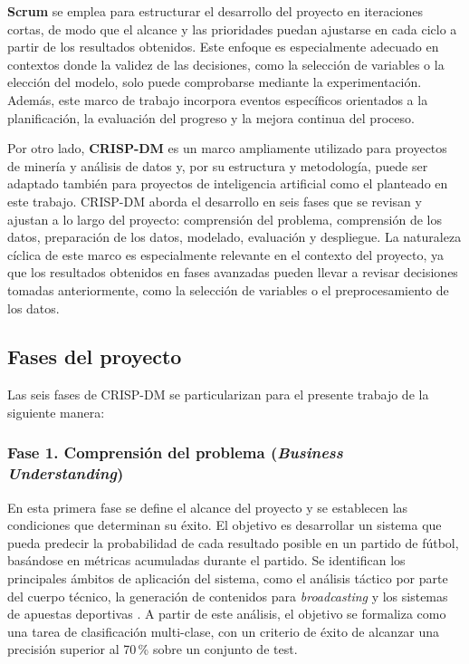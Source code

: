 \textbf{Scrum} se emplea para estructurar el desarrollo del proyecto en iteraciones cortas, de modo que el alcance y las prioridades puedan ajustarse en cada ciclo a partir de los resultados obtenidos. Este enfoque es especialmente adecuado en contextos donde la validez de las decisiones, como la selección de variables o la elección del modelo, solo puede comprobarse mediante la experimentación. Además, este marco de trabajo incorpora eventos específicos orientados a la planificación, la evaluación del progreso y la mejora continua del proceso.

Por otro lado, \textbf{CRISP-DM} es un marco ampliamente utilizado para proyectos de minería y análisis de datos y, por su estructura y metodología, puede ser adaptado también para proyectos de inteligencia artificial como el planteado en este trabajo. CRISP-DM aborda el desarrollo en seis fases que se revisan y ajustan a lo largo del proyecto: comprensión del problema, comprensión de los datos, preparación de los datos, modelado, evaluación y despliegue. La naturaleza cíclica de este marco es especialmente relevante en el contexto del proyecto, ya que los resultados obtenidos en fases avanzadas pueden llevar a revisar decisiones tomadas anteriormente, como la selección de variables o el preprocesamiento de los datos.

\subsection{Fases del proyecto}
Las seis fases de CRISP-DM se particularizan para el presente trabajo de la siguiente manera:

\subsubsection{Fase 1. Comprensión del problema (\textit{Business Understanding})}
En esta primera fase se define el alcance del proyecto y se establecen las condiciones que determinan su éxito. El objetivo es desarrollar un sistema que pueda predecir la probabilidad de cada resultado posible en un partido de fútbol, basándose en métricas acumuladas durante el partido. Se identifican los principales ámbitos de aplicación del sistema, como el análisis táctico por parte del cuerpo técnico, la generación de contenidos para \textit{broadcasting} y los sistemas de apuestas deportivas \citep{goes2021bigdata, rein2016bigdata}. A partir de este análisis, el objetivo se formaliza como una tarea de clasificación multi-clase, con un criterio de éxito de alcanzar una precisión superior al 70\,\% sobre un conjunto de test.

